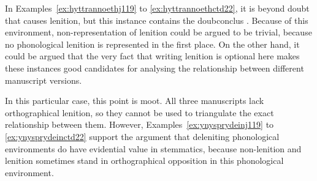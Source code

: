 


In Examples~\ref{ex:hyttrannoethj119} to \ref{ex:hyttrannoethctd22}, it is beyond doubt that  causes lenition, but this instance contains the \gls{doubconclus} . Because of this environment, non-representation of lenition could be argued to be trivial, because  no phonological lenition is represented in the first place. On the other hand, it could be argued that the very fact that writing lenition is optional here makes these instances good candidates for analysing the relationship between different manuscript versions.
\begin{mwl}
\end{mwl}
In this particular case, this point is moot. All three manuscripts lack orthographical lenition, so they cannot be used to triangulate the exact relationship between them. However, Examples~\ref{ex:ynysprydeinj119} to \ref{ex:ynysprydeinctd22}  support the argument that deleniting phonological environments do have evidential value in stemmatics, because non-lenition and lenition sometimes stand in orthographical opposition in this phonological environment.



